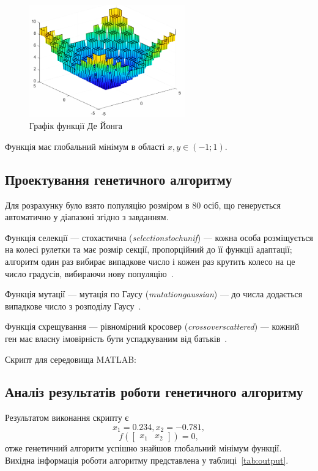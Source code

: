 \begin{figure}[H]
  \centering
    \includegraphics[width=0.6\textwidth]{images/plot_de_jong}
  \caption{Графік функції Де Йонга}
  \label{fig:plot_de_jong}
\end{figure}

Функція має глобальний мінімум в області $x,y\in(-1; 1)$. 

\subsection{Проектування генетичного алгоритму}
Для розрахунку було взято популяцію розміром в 80 осіб, що генерується автоматично у діапазоні згідно з завданням. 

Функція селекції --- стохастична (\textit{selectionstochunif}) --- кожна особа розміщується на колесі рулетки та має розмір секції, пропорційний до її функції адаптації; алгоритм один раз вибирає випадкове число і кожен раз крутить колесо на це число градусів, вибираючи нову популяцію~\cite{site:matlab_ga_options}.

Функція мутації --- мутація по Гаусу (\textit{mutationgaussian}) --- до числа додається випадкове число з розподілу Гаусу~\cite{site:matlab_ga_options}.

Функція схрещування --- рівномірний кросовер (\textit{crossoverscattered}) --- кожний ген має власну імовірність бути успадкуваним від батьків~\cite{site:matlab_ga_options}.

Скрипт для середовища MATLAB: 


\subsection{Аналіз результатів роботи генетичного алгоритму}
Результатом виконання скрипту є 
\[x_1=0.234, x_2=-0.781,\]
\[f(
\begin{bmatrix}
    x_1& x_2
\end{bmatrix}
)=0,\]
отже генетичний алгоритм успішно знайшов глобальний мінімум функції.
Вихідна інформація роботи алгоритму представлена у таблиці~\ref{tab:output}.

